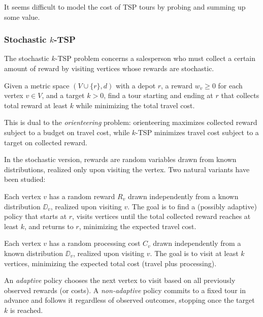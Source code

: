 \begin{remark}
    It seems difficult to model the cost of TSP tours by probing and summing up some value.
\end{remark}

\subsubsection{Stochastic $k$-TSP}

The stochastic $k$-TSP problem concerns a salesperson who must collect a certain amount of reward by visiting vertices whose rewards are stochastic.

\begin{definition}
    Given a metric space $(V \cup \{r\}, d)$ with a depot $r$, a reward $w_v \ge 0$ for each vertex $v \in V$, and a target $k > 0$, find a tour starting and ending at $r$ that collects total reward at least $k$ while minimizing the total travel cost.
\end{definition}

This is dual to the \emph{orienteering} problem: orienteering maximizes collected reward subject to a budget on travel cost, while $k$-TSP minimizes travel cost subject to a target on collected reward.

In the stochastic version, rewards are random variables drawn from known distributions, realized only upon visiting the vertex. Two natural variants have been studied:

\begin{definition}
    Each vertex $v$ has a random reward $R_v$ drawn independently from a known distribution $\DD_v$, realized upon visiting $v$. The goal is to find a (possibly adaptive) policy that starts at $r$, visits vertices until the total collected reward reaches at least $k$, and returns to $r$, minimizing the expected travel cost.
\end{definition}

\begin{definition}
    Each vertex $v$ has a random processing cost $C_v$ drawn independently from a known distribution $\DD_v$, realized upon visiting $v$. The goal is to visit at least $k$ vertices, minimizing the expected total cost (travel plus processing).
\end{definition}

\begin{definition}
    An \emph{adaptive} policy chooses the next vertex to visit based on all previously observed rewards (or costs). A \emph{non-adaptive} policy commits to a fixed tour in advance and follows it regardless of observed outcomes, stopping once the target $k$ is reached.
\end{definition}

